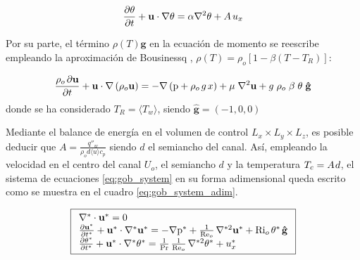 \begin{equation}
\frac{ \partial \theta }{ \partial t } + \mathbf{u} \cdot \nabla \theta = \alpha \nabla^2 \theta + A \hspace{0.5mm} u_x 
\label{eq:energy_pcb_source}
\end{equation}

Por su parte, el término $\rho(T) \mathbf{g}$ en la ecuación de momento se reescribe empleando la aproximación de Bousinessq \cite{incropera}, $\rho(T) = \rho_o \left[ 1 - \beta (T - T_R) \right]$:

\begin{equation}
\frac{ \rho_o \hspace{0.5mm} \partial \mathbf{u}}{\partial t} + \mathbf{u} \cdot \nabla  \left( \rho_o \mathbf{u} \right) = -\nabla \left( \text{p} + \rho_o \hspace{0.5mm} g \hspace{0.5mm} x \right) + \mu \hspace{1mm} {\nabla}^2 \mathbf{u}  + g \hspace{1mm} \rho_o \hspace{1mm} \beta \hspace{1mm} \theta \hspace{1mm} \mathbf{\hat{g}}   
\end{equation}
donde se ha considerado $T_R = \langle T_w \rangle$, siendo $\mathbf{\hat{g}}=(-1,0,0)$

Mediante el balance de energía en el volumen de control $L_x \times L_y \times L_z$, es posible deducir que $A = \frac{q''_w}{\rho_o  d \langle u \rangle c_p}$ siendo $d$ el semiancho del canal. Así, empleando la velocidad en el centro del canal $U_o$, el semiancho $d$ y la temperatura $T_c = A \hspace{0.3mm} d $, el sistema de ecuaciones \ref{eq:gob_system} en su forma adimensional queda escrito como se muestra en el cuadro \ref{eq:gob_system_adim}.

\begin{equation}
\boxed{
\begin{array}{l}
    \nabla^* \cdot \mathbf{u^*} = 0 \\
    \frac{\partial \mathbf{u^*}}{\partial t^*} + \mathbf{u^*} \cdot \nabla^* \mathbf{u^*} = 
    -\nabla \text{p}^* + \frac{1}{\text{Re}_o} \hspace{0.5mm} \nabla^{*2} \mathbf{u^*} + \text{Ri}_o \hspace{0.5mm} \theta^* \hspace{0.5mm} \mathbf{\hat{g}} \\
    \frac{\partial \theta^*}{\partial t^*} + \mathbf{u^*} \cdot \nabla^* \theta^* = 
    \frac{1}{\text{Pr}}\hspace{0.5mm}  \frac{1}{\text{Re}_o} \hspace{0.5mm} \nabla^{*2} \theta^* + u_x^* 
\end{array}
}
\label{eq:gob_system_adim}
\end{equation}

